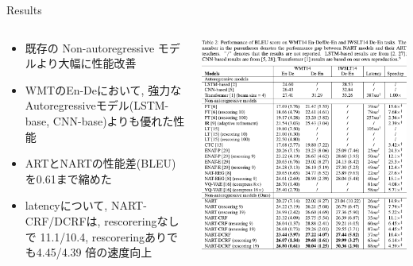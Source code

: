 \documentclass[unicode, 12pt, aspectratio=43]{beamer}
\begin{document}
\begin{frame}[label={sec:org77f7469}]{Results}
\begin{columns}
\begin{column}{0.35\columnwidth}
\fontsize{9.5pt}{0pt}
\begin{itemize}
\item 既存の Non-autoregressive モデルより大幅に性能改善
\item WMTのEn-Deにおいて, 強力なAutoregressiveモデル(LSTM-base, CNN-base)よりも優れた性能
\item ARTとNARTの性能差(BLEU)を0.61まで縮めた
\item latencyについて, NART-CRF/DCRFは, rescoreringなしで 11.1/10.4, rescoreringありでも4.45/4.39  倍の速度向上
\end{itemize}
\end{column}


\begin{column}{0.65\columnwidth}
\begin{center}
\includegraphics[width=1.0\linewidth]{./figure/Table2.pdf}
\end{center}
\end{column}
\end{columns}
\end{frame}
\end{document}
